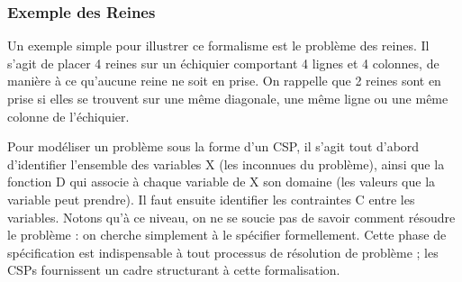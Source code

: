 
\subsubsection{Exemple des Reines}
Un exemple simple pour illustrer ce formalisme est le problème des reines. Il s'agit de placer 4 reines sur un échiquier comportant 4 lignes et 4 colonnes, de manière à ce qu'aucune reine ne soit en prise. On rappelle que 2 reines sont en prise si elles se trouvent sur une même diagonale, une même ligne ou une même colonne de l'échiquier.

Pour modéliser un problème sous la forme d'un CSP, il s'agit tout d'abord d'identifier l'ensemble des variables X (les inconnues du problème), ainsi que la fonction D qui associe à chaque variable de X son domaine (les valeurs que la variable peut prendre). Il faut ensuite identifier les contraintes C entre les variables. Notons qu'à ce niveau, on ne se soucie pas de savoir comment résoudre le problème : on cherche simplement à le spécifier formellement. Cette phase de spécification est indispensable à tout processus de résolution de problème ; les CSPs fournissent un cadre structurant à cette formalisation.

